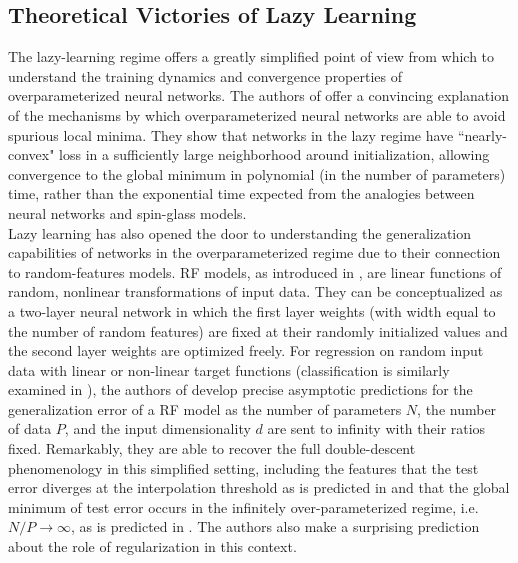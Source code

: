 \documentclass[a4paper, 12pt]{article}
\begin{document}
\subsection{Theoretical Victories of Lazy Learning}

The lazy-learning regime offers a greatly simplified point of view from which to understand the training dynamics and convergence properties of overparameterized neural networks. The authors of \cite{allen-zhuConvergenceTheoryDeep2019} offer a convincing explanation of the mechanisms by which overparameterized neural networks are able to avoid spurious local minima. They show that networks in the lazy regime have ``nearly-convex" loss in a sufficiently large neighborhood around initialization, allowing convergence to the global minimum in polynomial (in the number of parameters) time, rather than the exponential time expected from the analogies between neural networks and spin-glass models.\\

Lazy learning has also opened the door to understanding the generalization capabilities of networks in the overparameterized regime due to their connection to random-features models. RF models, as introduced in \cite{rahimiRandomFeaturesLargeScale2008}, are linear functions of random, nonlinear transformations of input data. They can be conceptualized as a two-layer neural network in which the first layer weights (with width equal to the number of random features) are fixed at their randomly initialized values and the second layer weights are optimized freely. For regression on random input data with linear or non-linear target functions (classification is similarly examined in \cite{dengModelDoubleDescent2020}), the authors of  \cite{meiGeneralizationErrorRandom2019} develop precise asymptotic predictions for the generalization error of a RF model as the number of parameters $N$, the number of data $P$, and the input dimensionality $d$ are sent to infinity with their ratios fixed. Remarkably, they are able to recover the full double-descent phenomenology in this simplified setting, including the features that the test error diverges at the interpolation threshold as is predicted in \cite{geigerScalingDescriptionGeneralization2019} and that the global minimum of test error occurs in the infinitely over-parameterized regime, i.e. $N/P\rightarrow\infty$, as is predicted in . The authors also make a surprising prediction about the role of regularization in this context. \\
\end{document}
